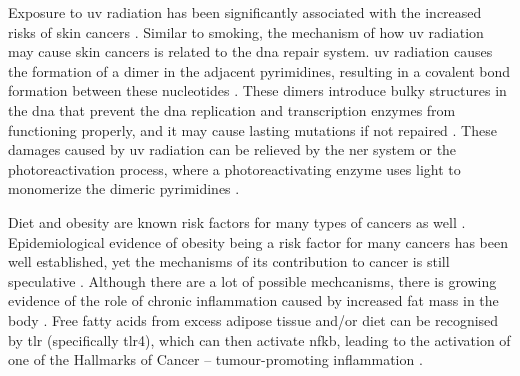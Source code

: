 Exposure to \gls{uv} radiation has been significantly associated with the increased risks of skin cancers \citep{Armstrong2001,Gallagher2006}.
Similar to smoking, the mechanism of how \gls{uv} radiation may cause  skin cancers is related to the \acrshort{dna} repair system.
\gls{uv} radiation causes the formation of a dimer in the adjacent pyrimidines, resulting in a covalent bond formation between these nucleotides \citep{Friedberg2003,Hoeijmakers2001}.
These dimers introduce bulky structures in the \acrshort{dna} that prevent the \acrshort{dna} replication and transcription enzymes from functioning properly, and it may cause lasting mutations if not repaired \citep{Friedberg2003,Hoeijmakers2001}.
These damages caused by \gls{uv} radiation can be relieved by the \gls{ner} system or the photoreactivation process, where a photoreactivating enzyme uses light to monomerize the dimeric pyrimidines \citep{Friedberg2003}.

Diet and obesity are known risk factors for many types of cancers as well \citep{Ames1995a,Calle2004}.
Epidemiological evidence of obesity being a risk factor for many cancers has been well established, yet the mechanisms of its contribution to cancer is still  speculative \citep{Calle2003,Kelesidis2006}.
Although there are a lot of possible mechcanisms, there is growing evidence of the role of chronic inflammation caused by increased fat mass in the body \citep{Kelesidis2006,Lumeng2011,Hernandez2013}.
Free fatty acids from excess adipose tissue and/or diet can be recognised by \gls{tlr} (specifically \gls{tlr}4), which can then activate \gls{nfkb}, leading to the activation of one of the Hallmarks of Cancer -- tumour-promoting inflammation \citep{Lumeng2011}.

